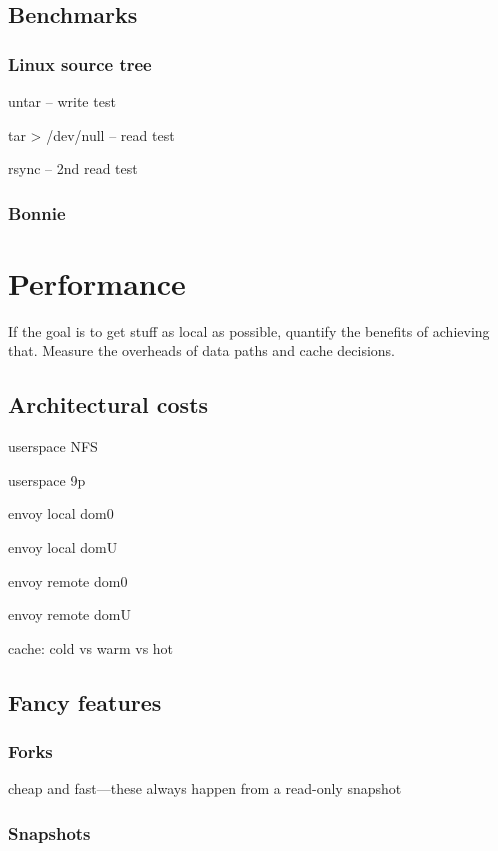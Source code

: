 \subsection{Benchmarks}

\subsubsection{Linux source tree}
untar -- write test

tar > /dev/null -- read test

rsync -- 2nd read test

\subsubsection{Bonnie}

\section{Performance}

If the goal is to get stuff as local as possible, quantify the benefits of achieving that. Measure the overheads of data paths and cache decisions.

\subsection{Architectural costs}\label{sec:architectural-costs}

userspace NFS

userspace 9p

envoy local dom0

envoy local domU

envoy remote dom0

envoy remote domU

cache: cold vs warm vs hot

\subsection{Fancy features}
\subsubsection{Forks}

cheap and fast---these always happen from a read-only snapshot

\subsubsection{Snapshots}

